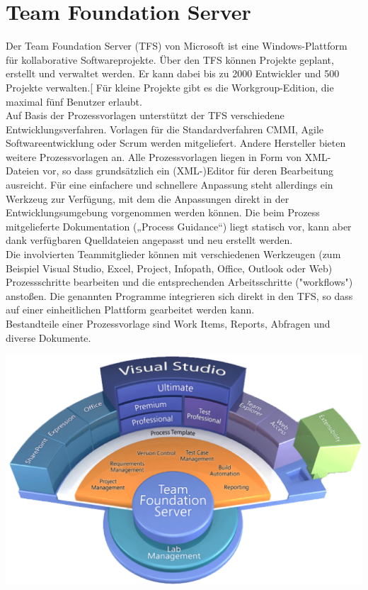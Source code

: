 \documentclass[10pt]{article}
\begin{document}
\section{Team Foundation Server}
Der Team Foundation Server (TFS) von Microsoft ist eine Windows-Plattform für kollaborative Softwareprojekte. Über den TFS können Projekte geplant, erstellt und verwaltet werden. Er kann dabei bis zu 2000 Entwickler und 500 Projekte verwalten.[ Für kleine Projekte gibt es die Workgroup-Edition, die maximal fünf Benutzer erlaubt. \\
Auf Basis der Prozessvorlagen unterstützt der TFS verschiedene Entwicklungsverfahren. Vorlagen für die Standardverfahren CMMI, Agile Softwareentwicklung oder Scrum werden mitgeliefert. Andere Hersteller bieten weitere Prozessvorlagen an. Alle Prozessvorlagen liegen in Form von XML-Dateien vor, so dass grundsätzlich ein (XML-)Editor für deren Bearbeitung ausreicht. Für eine einfachere und schnellere Anpassung steht allerdings ein Werkzeug zur Verfügung, mit dem die Anpassungen direkt in der Entwicklungsumgebung vorgenommen werden können. Die beim Prozess mitgelieferte Dokumentation („Process Guidance“) liegt statisch vor, kann aber dank verfügbaren Quelldateien angepasst und neu erstellt werden. \\
Die involvierten Teammitglieder können mit verschiedenen Werkzeugen (zum Beispiel Visual Studio, Excel, Project, Infopath, Office, Outlook oder Web) Prozessschritte bearbeiten und die entsprechenden Arbeitsschritte ("workflows") anstoßen. Die genannten Programme integrieren sich direkt in den TFS, so dass auf einer einheitlichen Plattform gearbeitet werden kann. \\
Bestandteile einer Prozessvorlage sind Work Items, Reports, Abfragen und diverse Dokumente.
\begin{center}
	\includegraphics[scale=0.4]{tfs.png}
\end{center}
\end{document}
